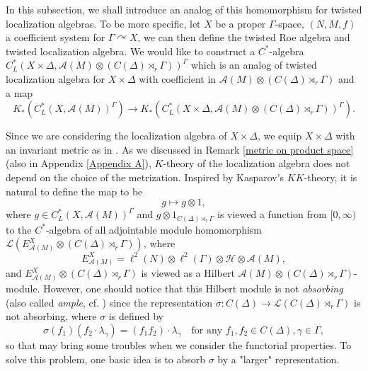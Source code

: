\documentclass[11pt]{article}
\theoremstyle{definition}
\theoremstyle{plain}
\def\A{\mathcal A}\def\C{\mathcal C}\def\B{\mathcal B}\def\E{\mathcal E}\def\O{\mathcal O}\def\h{\mathfrak h}\def\K{\mathcal K}\def\F{\mathcal F}\def\P{\mathcal P}\def\L{\mathcal L}\def\R{\mathcal R}\def\Q{\mathcal Q}\def\H{\mathcal H}\def\S{\mathcal S}\def\N{\mathcal N}\def\U{\mathcal U}\def\V{\mathcal V}
\def\ox{\otimes}
\def\ox{\otimes}
\def\Ga{\Gamma}
\def\car{\curvearrowright}
\begin{document}
In this subsection, we shall introduce an analog of this homomorphism for twisted localization algebras. To be more specific, let $X$ be a proper $\Ga$-space, $(N, M,f)$ a coefficient system for $\Ga\car X$, we can then define the twisted Roe algebra and twisted localization algebra. We would like to construct a $C^*$-algebra $C^*_L(X\times\Delta,\A(M)\ox(C(\Delta)\rtimes_r\Ga))^{\Ga}$ which is an analog of twisted localization algebra for $X\times\Delta$ with coefficient in $\A(M)\ox (C(\Delta)\rtimes_r\Ga)$ and a map
$$K_*(C^*_L(X,\A(M))^{\Ga})\to K_*(C^*_L(X\times\Delta,\A(M)\ox(C(\Delta)\rtimes_r\Ga))^{\Ga}).$$

Since we are considering the localization algebra of $X\times\Delta$, we equip $X\times\Delta$ with an invariant metric as in \cite[Theorem 4.3.4]{metrizationGaspace}. As we discussed in Remark \ref{metric on product space} (also in Appendix \ref{Appendix A}), $K$-theory of the localization algebra does not depend on the choice of the metrization.
Inspired by Kasparov's $KK$-theory, it is natural to define the map to be
$$g\mapsto g\ox 1,$$
where $g\in C^*_L(X,\A(M))^{\Ga}$ and $g\ox 1_{C(\Delta)\rtimes_r\Ga}$ is viewed a function from $[0,\infty)$ to the $C^*$-algebra of all adjointable module homomorphism $\L\left(E^X_{\A(M)}\ox(C(\Delta)\rtimes_r\Ga)\right)$, where
$$E^X_{\A(M)}=\ell^2(N)\ox\ell^2(\Ga)\ox\H\ox\A(M),$$
and $E^X_{\A(M)}\ox(C(\Delta)\rtimes_r\Ga)$ is viewed as a Hilbert $\A(M)\ox(C(\Delta)\rtimes_r\Ga)$-module.
However, one should notice that this Hilbert module is not \emph{absorbing} (also called \emph{ample}, cf. \cite[Definition 2.1]{DWW2018}) since the representation $\sigma: C(\Delta)\to\L(C(\Delta)\rtimes_r\Ga)$ is not absorbing, where $\sigma$ is defined by
$$\sigma(f_1)(f_2\cdot\lambda_\gamma)=(f_1f_2)\cdot\lambda_\gamma\quad\text{for any }f_1,f_2\in C(\Delta),\gamma\in\Ga,$$
so that may bring some troubles when we consider the functorial properties. To solve this problem, one basic idea is to absorb $\sigma$ by a "larger" representation.  
\end{document}
